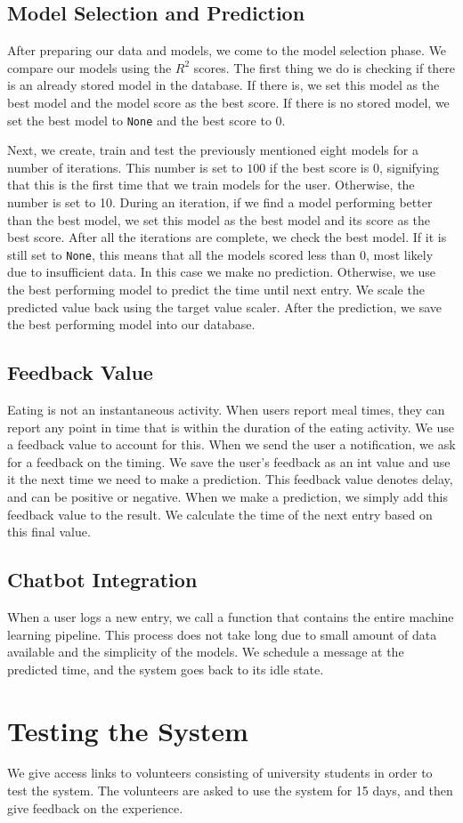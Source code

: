 \subsection{Model Selection and Prediction}
After preparing our data and models, we come to the model selection phase.
We compare our models using the $R^2$ scores.
The first thing we do is checking if there is an already stored model in the database.
If there is, we set this model as the best model and the model score as the best score.
If there is no stored model, we set the best model to \texttt{None} and the best score to $0$.

Next, we create, train and test the previously mentioned eight models for a number of iterations.
This number is set to $100$ if the best score is $0$, signifying that this is the first time that we train models for the user.
Otherwise, the number is set to 10.
During an iteration, if we find a model performing better than the best model, we set this model as the best model and its score as the best score.
After all the iterations are complete, we check the best model.
If it is still set to \texttt{None}, this means that all the models scored less than $0$, most likely due to insufficient data.
In this case we make no prediction.
Otherwise, we use the best performing model to predict the time until next entry.
We scale the predicted value back using the target value scaler.
After the prediction, we save the best performing model into our database.

\subsection{Feedback Value}
Eating is not an instantaneous activity.
When users report meal times, they can report any point in time that is within the duration of the eating activity.
We use a feedback value to account for this.
When we send the user a notification, we ask for a feedback on the timing.
We save the user's feedback as an int value and use it the next time we need to make a prediction.
This feedback value denotes delay, and can be positive or negative.
When we make a prediction, we simply add this feedback value to the result.
We calculate the time of the next entry based on this final value.

\subsection{Chatbot Integration}
When a user logs a new entry, we call a function that contains the entire machine learning pipeline.
This process does not take long due to small amount of data available and the simplicity of the models.
We schedule a message at the predicted time, and the system goes back to its idle state.
\section{Testing the System}
We give access links to volunteers consisting of university students in order to test the system.
The volunteers are asked to use the system for 15 days, and then give feedback on the experience.
